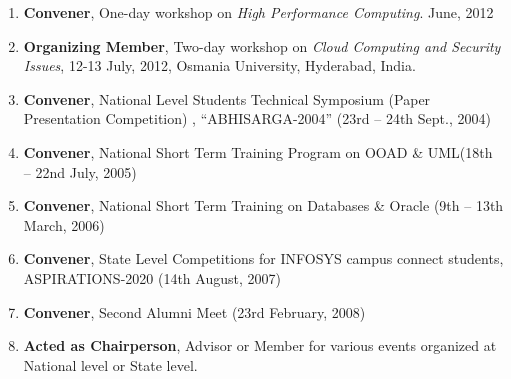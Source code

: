 \begin{enumerate} [label=(E\arabic*).]
\item
\textbf{Convener}, One-day workshop on\textit{ High Performance Computing}. June, 2012

\item
\textbf{Organizing Member}, Two-day workshop on\textit{ Cloud Computing and Security Issues}, 12-13 July, 2012, Osmania University, Hyderabad, India.

\item
\textbf{Convener}, National Level Students Technical Symposium (Paper Presentation Competition) , “ABHISARGA-2004” (23rd – 24th Sept., 2004) 

\item
\textbf{Convener}, National Short Term Training Program on OOAD \& UML(18th – 22nd July, 2005) 

\item
\textbf{Convener}, National Short Term Training on Databases \& Oracle (9th – 13th March, 2006) 

\item
\textbf{Convener}, State Level Competitions for INFOSYS campus connect students, ASPIRATIONS-2020 (14th August, 2007) 

\item
\textbf{Convener}, Second Alumni Meet (23rd February, 2008) 

\item
\textbf{Acted as Chairperson}, Advisor or Member for various events organized at National level or State level.

\end{enumerate}